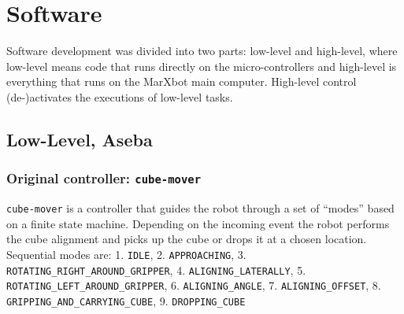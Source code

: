 \section{Software}
Software development was divided into two parts: low-level and high-level, where low-level means code that runs directly on the micro-controllers and high-level is everything that runs on the MarXbot main computer. High-level control (de-)activates the executions of low-level tasks.

\subsection{Low-Level, Aseba}


\subsubsection{Original controller: \texttt{cube-mover}}
\texttt{cube-mover} is a controller that guides the robot through a set of ``modes'' based on a finite state machine. Depending on the incoming event
the robot performs the cube alignment and picks up the cube or drops it at a chosen location. Sequential modes are:
1. \texttt{IDLE},
2. \texttt{APPROACHING},
3. \texttt{ROTATING\_RIGHT\_AROUND\_GRIPPER},
4. \texttt{ALIGNING\_LATERALLY},
5. \texttt{ROTATING\_LEFT\_AROUND\_GRIPPER},
6. \texttt{ALIGNING\_ANGLE},
7. \texttt{ALIGNING\_OFFSET},
8. \texttt{GRIPPING\_AND\_CARRYING\_CUBE},
9. \texttt{DROPPING\_CUBE}


